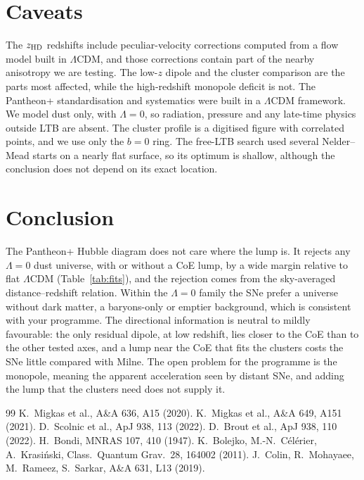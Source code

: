 \documentclass[10pt,twocolumn,letterpaper]{article}
\begin{document}
\section{Caveats}
The $z_{\rm HD}$ redshifts include peculiar-velocity corrections computed from a flow model built in $\Lambda$CDM, and those corrections contain part of the nearby anisotropy we are testing. The low-$z$ dipole and the cluster comparison are the parts most affected, while the high-redshift monopole deficit is not. The Pantheon+ standardisation and systematics were built in a $\Lambda$CDM framework. We model dust only, with $\Lambda=0$, so radiation, pressure and any late-time physics outside LTB are absent. The cluster profile is a digitised figure with correlated points, and we use only the $b=0$ ring. The free-LTB search used several Nelder--Mead starts on a nearly flat surface, so its optimum is shallow, although the conclusion does not depend on its exact location.

\section{Conclusion}
The Pantheon+ Hubble diagram does not care where the lump is. It rejects any $\Lambda=0$ dust universe, with or without a CoE lump, by a wide margin relative to flat $\Lambda$CDM (Table~\ref{tab:fits}), and the rejection comes from the sky-averaged distance--redshift relation. Within the $\Lambda=0$ family the SNe prefer a universe without dark matter, a baryons-only or emptier background, which is consistent with your programme. The directional information is neutral to mildly favourable: the only residual dipole, at low redshift, lies closer to the CoE than to the other tested axes, and a lump near the CoE that fits the clusters costs the SNe little compared with Milne. The open problem for the programme is the monopole, meaning the apparent acceleration seen by distant SNe, and adding the lump that the clusters need does not supply it.

\begin{thebibliography}{99}\footnotesize
{} K.~Migkas et al., A\&A 636, A15 (2020).
 K.~Migkas et al., A\&A 649, A151 (2021).
 D.~Scolnic et al., ApJ 938, 113 (2022).
 D.~Brout et al., ApJ 938, 110 (2022).
 H.~Bondi, MNRAS 107, 410 (1947).
 K.~Bolejko, M.-N.~C\'el\'erier, A.~Krasi\'nski, Class.\ Quantum Grav.\ 28, 164002 (2011).
 J.~Colin, R.~Mohayaee, M.~Rameez, S.~Sarkar, A\&A 631, L13 (2019).
\end{thebibliography}
\end{document}
